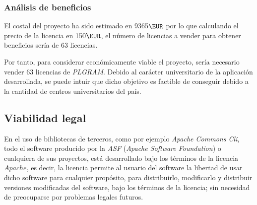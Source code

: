 \subsubsection{Análisis de beneficios}

El costal del proyecto ha sido estimado en 9365$\EUR$ por lo que calculando el precio de la licencia en 150$\EUR$, el número de licencias a vender para obtener beneficios sería de 63 licencias.

Por tanto, para considerar económicamente viable el proyecto, sería necesario vender 63 licencias de \textit{PLGRAM}. Debido al carácter universitario de la aplicación desarrollada, se puede intuir que dicho objetivo es factible de conseguir debido a la cantidad de centros universitarios del país.

\subsection{Viabilidad legal}

En el uso de bibliotecas de terceros, como por ejemplo \textit{Apache Commons Cli}, todo el software producido por la \textit{ASF} (\textit{Apache Software Foundation}) o cualquiera de sus proyectos, está desarrollado bajo los términos de la licencia $Apache$, es decir, la licencia permite al usuario del software la libertad de usar dicho software para cualquier propósito, para distribuirlo, modificarlo y distribuir versiones modificadas del software, bajo los términos de la licencia; sin necesidad de preocuparse por problemas legales futuros\cite{apache}.

